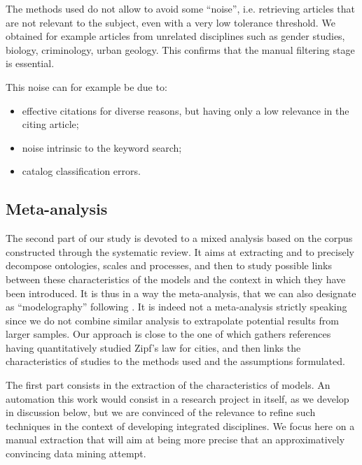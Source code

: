 \documentclass[10pt]{article}
\begin{document}
The methods used do not allow to avoid some ``noise'', i.e. retrieving articles that are not relevant to the subject, even with a very low tolerance threshold. We obtained for example articles from unrelated disciplines such as gender studies, biology, criminology, urban geology.
 This confirms that the manual filtering stage is essential.

This noise can for example be due to:
\begin{itemize}
	\item effective citations for diverse reasons, but having only a low relevance in the citing article;
	\item noise intrinsic to the keyword search;
	\item catalog classification errors.
\end{itemize}


\subsection{Meta-analysis}


The second part of our study is devoted to a mixed analysis based on the corpus constructed through the systematic review. %
 It aims at extracting and to precisely decompose ontologies, scales and processes, and then to study possible links between these characteristics of the models and the context in which they have been introduced. It is thus in a way the meta-analysis, that we can also designate as ``modelography'' following \cite{schmitt2013modelographie}. It is indeed not a meta-analysis strictly speaking since we do not combine similar analysis to extrapolate potential results from larger samples. Our approach is close to the one of \cite{cottineau2017metazipf} which gathers references having quantitatively studied Zipf's law for cities, and then links the characteristics of studies to the methods used and the assumptions formulated.

The first part consists in the extraction of the characteristics of models. An automation this work would consist in a research project in itself, as we develop in discussion below, but we are convinced of the relevance to refine such techniques %
 in the context of developing integrated disciplines. We focus here on a manual extraction that will aim at being more precise that an approximatively convincing data mining attempt.
 
\end{document}
